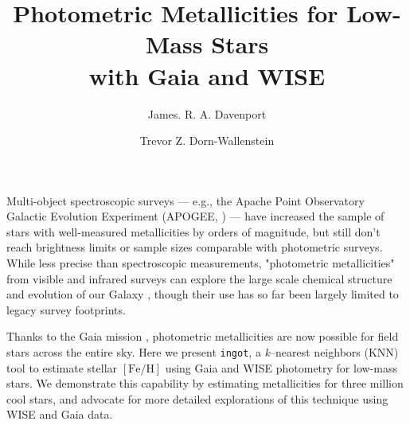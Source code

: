 \documentclass[modern]{rnaastex}
\newcommand{\ingot}{{\tt ingot}\xspace} %
\newcommand{\feh}{$[\mathrm{Fe}/\mathrm{H}]$\xspace}
\begin{document}
\title{Photometric Metallicities for Low-Mass Stars\\ with Gaia and WISE}


\author[0000-0002-0637-835X]{James. R. A. Davenport}

\author[0000-0003-3601-3180]{Trevor Z. Dorn-Wallenstein}



\section{} 

Multi-object spectroscopic surveys --- e.g., the Apache Point Observatory Galactic Evolution Experiment (APOGEE, \citealt{majewski17}) --- have increased the sample of stars with well-measured metallicities by orders of magnitude, but still don't reach brightness limits or sample sizes comparable with photometric surveys. 
While less precise than spectroscopic measurements, "photometric metallicities" from visible and infrared surveys can explore the large scale chemical structure and evolution of our Galaxy \citep[e.g.][]{ivezic08,schmidt16}, though their use has so far been largely limited to legacy survey footprints.


Thanks to the Gaia mission \citep{gaia_dr2}, photometric metallicities are now possible for field stars across the entire sky. Here we present \ingot \citep{ingot}, a {\it k}--nearest neighbors (KNN) tool to estimate stellar \feh using Gaia and WISE photometry for low-mass stars. We demonstrate this capability by estimating metallicities for three million cool stars, and advocate for more detailed explorations of this technique using WISE and Gaia data.
\end{document}
